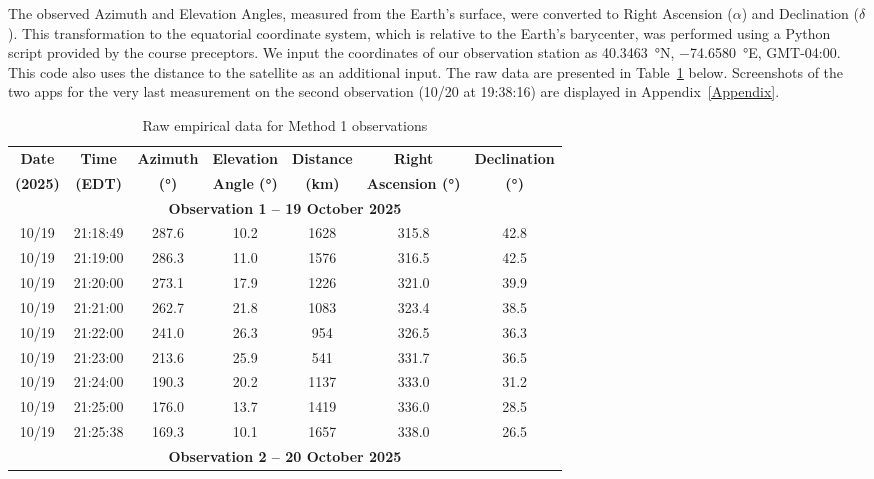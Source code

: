 \documentclass{article}
\begin{document}
The observed Azimuth and Elevation Angles, measured from the Earth's surface, were converted to Right Ascension ($\alpha$) and Declination ($\delta$). This transformation to the equatorial coordinate system, which is relative to the Earth's barycenter, was performed using a Python script provided by the course preceptors. We input the coordinates of our observation station as \SI{40.3463}{\degree}N, \SI{-74.6580}{\degree}E, GMT-04:00. This code also uses the distance to the satellite as an additional input. The raw data are presented in Table~\ref{tab:method1_data} below. Screenshots of the two apps for the very last measurement on the second observation (10/20 at 19:38:16) are displayed in Appendix~\ref{Appendix}.

\begin{table}[H]
    \centering
    \caption{Raw empirical data for Method 1 observations}
    \label{tab:method1_data}
    \renewcommand{\arraystretch}{1.2}
    \begin{tabular}{|c|c|c|c|c|c|c|}
        \hline
        \textbf{Date} & \textbf{Time} & \textbf{Azimuth} & \textbf{Elevation} & \textbf{Distance} & \textbf{Right} & \textbf{Declination} \\ 
        \textbf{(2025)} & \textbf{(EDT)} & \textbf{(°)} & \textbf{Angle (°)} & \textbf{(km)} & \textbf{Ascension (°)} & \textbf{(°)} \\ \hline
        \multicolumn{7}{|c|}{\textbf{Observation 1 – 19 October 2025}} \\ \hline
        10/19 & 21:18:49 & 287.6 & 10.2 & 1628 & 315.8 & 42.8 \\ \hline
        10/19 & 21:19:00 & 286.3 & 11.0 & 1576 & 316.5 & 42.5 \\ \hline
        10/19 & 21:20:00 & 273.1 & 17.9 & 1226 & 321.0 & 39.9 \\ \hline
        10/19 & 21:21:00 & 262.7 & 21.8 & 1083 & 323.4 & 38.5 \\ \hline
        10/19 & 21:22:00 & 241.0 & 26.3 &  954 & 326.5 & 36.3 \\ \hline
        10/19 & 21:23:00 & 213.6 & 25.9 &  541 & 331.7 & 36.5 \\ \hline
        10/19 & 21:24:00 & 190.3 & 20.2 & 1137 & 333.0 & 31.2 \\ \hline
        10/19 & 21:25:00 & 176.0 & 13.7 & 1419 & 336.0 & 28.5 \\ \hline
        10/19 & 21:25:38 & 169.3 & 10.1 & 1657 & 338.0 & 26.5 \\ \hline
        \multicolumn{7}{|c|}{\textbf{Observation 2 – 20 October 2025}} \\ \hline

\end{tabular}
\end{table}
\end{document}

